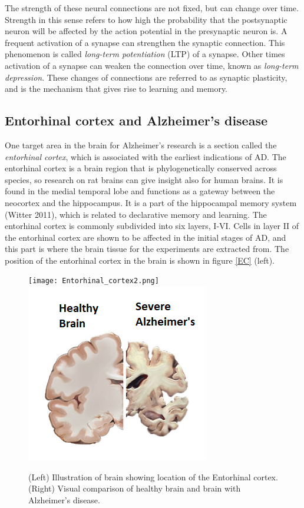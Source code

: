 The strength of these neural connections are not fixed, but can change over time. Strength in this sense refers to how high the probability that the postsynaptic neuron will be affected by the action potential in the presynaptic neuron is. A frequent activation of a synapse can strengthen the synaptic connection. This phenomenon is called \textit{long-term potentiation} (LTP) of a synapse. Other times activation of a synapse can weaken the connection over time, known as \textit{long-term depression}. These changes of connections are referred to as synaptic plasticity, and is the mechanism that gives rise to learning and memory. \\

\subsection{Entorhinal cortex and Alzheimer's disease}
\label{EandA}

One target area in the brain for Alzheimer's research is a section called the \textit{entorhinal cortex}, which is associated with the earliest indications of AD. The entorhinal cortex is a brain region that is phylogenetically conserved across species, so research on rat brains can give insight also for human brains. It is found in the medial temporal lobe and functions as a gateway between the neocortex and the hippocampus. It is a part of the hippocampal memory system (Witter 2011), which is related to declarative memory and learning. The entorhinal cortex is commonly subdivided into six layers, I-VI. Cells in layer II of the entorhinal cortex are shown to be affected in the initial stages of AD, and this part is where the brain tissue for the experiments are extracted from. The position  of the entorhinal cortex in the brain is shown in figure \ref{EC} (left).

\begin{figure}[h]
    \caption{(Left) Illustration of brain showing location of the Entorhinal cortex. (Right) Visual comparison of healthy brain and brain with Alzheimer's disease.}
    \label{EC}
    \centering
    \texttt{[image: Entorhinal\_cortex2.png]}
    \includegraphics[scale=0.8]{fig/Alzheimers_picture.png}    
    \label{brain}
\end{figure} 

